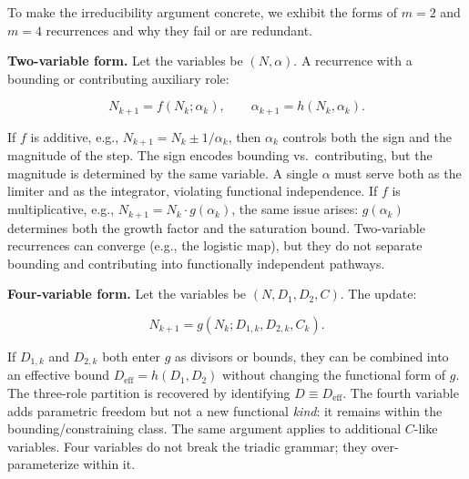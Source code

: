 \documentclass[12pt]{article}
\begin{document}
To make the irreducibility argument concrete, we exhibit the forms of
\(m = 2\) and \(m = 4\) recurrences and why they fail or are redundant.

\textbf{Two-variable form.} Let the variables be \((N, \alpha)\). A
recurrence with a bounding or contributing auxiliary role:

\[N_{k+1} = f(N_k; \alpha_k), \qquad \alpha_{k+1} = h(N_k, \alpha_k).\]

If \(f\) is additive, e.g., \(N_{k+1} = N_k \pm 1/\alpha_k\), then
\(\alpha_k\) controls both the sign and the magnitude of the step. The
sign encodes bounding vs.~contributing, but the magnitude is determined
by the same variable. A single \(\alpha\) must serve both as the limiter
and as the integrator, violating functional independence. If \(f\) is
multiplicative, e.g., \(N_{k+1} = N_k \cdot g(\alpha_k)\), the same
issue arises: \(g(\alpha_k)\) determines both the growth factor and the
saturation bound. Two-variable recurrences can converge (e.g., the
logistic map), but they do not separate bounding and contributing into
functionally independent pathways.

\textbf{Four-variable form.} Let the variables be \((N, D_1, D_2, C)\).
The update:

\[N_{k+1} = g(N_k; D_{1,k}, D_{2,k}, C_k).\]

If \(D_{1,k}\) and \(D_{2,k}\) both enter \(g\) as divisors or bounds,
they can be combined into an effective bound
\(D_{\text{eff}} = h(D_1, D_2)\) without changing the functional form of
\(g\). The three-role partition is recovered by identifying
\(D \equiv D_{\text{eff}}\). The fourth variable adds parametric freedom
but not a new functional \emph{kind}: it remains within the
bounding/constraining class. The same argument applies to additional
\(C\)-like variables. Four variables do not break the triadic grammar;
they over-parameterize within it.
\end{document}

